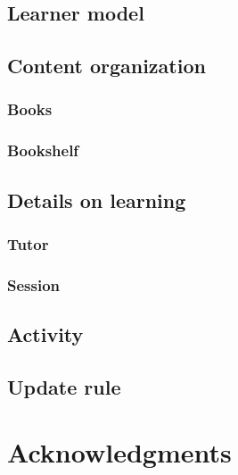 \documentclass[11pt,a4paper]{article}
\begin{document}
\subsection{Learner model}
\subsection{Content organization}
\subsubsection{Books}
\subsubsection{Bookshelf}

\subsection{Details on learning}
\subsubsection{Tutor}
\subsubsection{Session}


\subsection{Activity}
\subsection{Update rule}


\section*{Acknowledgments}

%
%


\end{document}
